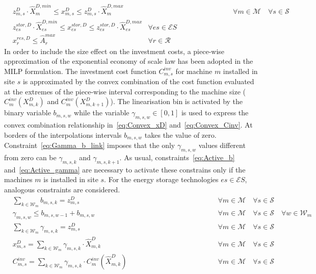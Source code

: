 \documentclass{article}
\newcommand{\cM}{{\mathcal M}}
\newcommand{\cS}{{\mathcal S}}
\newcommand{\cR}{{\mathcal R}}
\newcommand{\cES}{{\mathcal ES}}
\newcommand{\cW}{{\mathcal W}}
\begin{document}
{		\begin{align}
		& z_{m,s}^D \cdot \hat{X}_{m}^{D, min} \leq x_{m,s}^D \leq z_{m,s}^D \cdot \hat{X}_{m}^{D, max} &\hspace{5cm} \forall m \in \cM \quad \forall s \in \cS \label{eq:Size_lim} \\
		& z_{es}^{stor,D} \cdot \hat{X}_{es}^{D, min} \leq x_{es}^{stor,D} \leq z_{es}^{stor,D} \cdot \hat{X}_{es}^{D, max} & \forall es \in \cES \label{eq:Size_stor_max} \\
		& x_r^{res, D} \leq \hat{A}_r^{max} & \forall r \in \cR \label{eq:MaxArea_available}
		\end{align}
In order to include the size effect on the investment costs, a piece-wise approximation of the exponential economy of scale law has been adopted in the MILP formulation. The investment cost function $C_{m,s}^{inv}$ for machine $m$ installed in site $s$ is approximated by the convex combination of the cost function evaluated at the extremes of the piece-wise interval corresponding to the machine size ($C_{m}^{inv}(X_{m,k}^D)$ and $C_{m}^{inv}(X_{m,k+1}^D)$). 
The linearisation bin is activated by the binary variable $b_{m,s,w}$ while the variable $\gamma_{m,s,w} \in [0,1]$ is used to express the convex combination relationship in~\eqref{eq:Convex_xD} and~\eqref{eq:Convex_Cinv}. 
At borders of the interpolations intervals $b_{m,s,w}$ takes the value of zero. Constraint~\eqref{eq:Gamma_b_link} imposes that the only $\gamma_{m,s,w}$ values different from zero can be $\gamma_{m,s,k}$ and $\gamma_{m,s,k+1}$. As usual, constraints~\eqref{eq:Active_b} and~\eqref{eq:Active_gamma} are necessary to activate these constrains only if the machines $m$ is installed in site $s$. For the energy storage technologies $es \in \cES$, analogous constraints are considered. 
		\begin{align}
		& \sum_{k \in \cW_m} b_{m,s,k} = z_{m,s}^D & \hspace{5cm} \forall m \in \cM \quad \forall s \in \cS \label{eq:Active_b}\\
		& \gamma_{m,s,w} \leq b_{m,s,w-1} + b_{m,s,w}  & \hspace{5cm} \forall m \in \cM \quad \forall s \in \cS \quad \forall w \in \cW_m \label{eq:Gamma_b_link}\\
		& \sum_{k \in \cW_m} \gamma_{m,s,k} = z_{m,s}^D & \hspace{5cm} \forall m \in \cM \quad \forall s \in \cS \label{eq:Active_gamma}\\
		& x_{m,s}^D = \sum_{k \in \cW_m} \gamma_{m,s,k} \cdot \hat{X}_{m,k}^D & \hspace{5cm} \forall m \in \cM \quad \forall s \in \cS \label{eq:Convex_xD}\\
		& C_{m,s}^{inv} = \sum_{k \in \cW_m} \gamma_{m,s,k} \cdot C_{m}^{inv}(\hat{X}_{m,k}^D) & \hspace{5cm} \forall m \in \cM \quad \forall s \in \cS \label{eq:Convex_Cinv}
		\end{align}				

}
\end{document}

